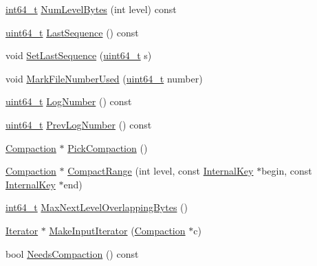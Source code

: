 \begin{DoxyCompactItemize}
\item 
\hyperlink{stdint_8h_adec1df1b8b51cb32b77e5b86fff46471}{int64\+\_\+t} \hyperlink{classleveldb_1_1_version_set_adfe3e1061becd9e2756b2dd4447b52e0}{Num\+Level\+Bytes} (int level) const 
\item 
\hyperlink{stdint_8h_aaa5d1cd013383c889537491c3cfd9aad}{uint64\+\_\+t} \hyperlink{classleveldb_1_1_version_set_acbbb32422426416b0d5e58d35b151526}{Last\+Sequence} () const 
\item 
void \hyperlink{classleveldb_1_1_version_set_a2234860e72a1ac7361d7bee107da6a07}{Set\+Last\+Sequence} (\hyperlink{stdint_8h_aaa5d1cd013383c889537491c3cfd9aad}{uint64\+\_\+t} s)
\item 
void \hyperlink{classleveldb_1_1_version_set_a8a009a58938b12c7a69bda2b4da115a0}{Mark\+File\+Number\+Used} (\hyperlink{stdint_8h_aaa5d1cd013383c889537491c3cfd9aad}{uint64\+\_\+t} number)
\item 
\hyperlink{stdint_8h_aaa5d1cd013383c889537491c3cfd9aad}{uint64\+\_\+t} \hyperlink{classleveldb_1_1_version_set_a0ff6a25abcf0b0c7d94bd425b6fb0ef2}{Log\+Number} () const 
\item 
\hyperlink{stdint_8h_aaa5d1cd013383c889537491c3cfd9aad}{uint64\+\_\+t} \hyperlink{classleveldb_1_1_version_set_a0c2a382650ba2b987d8059faacbd0c39}{Prev\+Log\+Number} () const 
\item 
\hyperlink{classleveldb_1_1_compaction}{Compaction} $\ast$ \hyperlink{classleveldb_1_1_version_set_a1cdc6a05e0a7df9f29b5bccd485a0219}{Pick\+Compaction} ()
\item 
\hyperlink{classleveldb_1_1_compaction}{Compaction} $\ast$ \hyperlink{classleveldb_1_1_version_set_a3a03f9a6c86e861be314cf8e01f33142}{Compact\+Range} (int level, const \hyperlink{classleveldb_1_1_internal_key}{Internal\+Key} $\ast$begin, const \hyperlink{classleveldb_1_1_internal_key}{Internal\+Key} $\ast$end)
\item 
\hyperlink{stdint_8h_adec1df1b8b51cb32b77e5b86fff46471}{int64\+\_\+t} \hyperlink{classleveldb_1_1_version_set_a32dc1a7e1eaeeeac89286be3483ad612}{Max\+Next\+Level\+Overlapping\+Bytes} ()
\item 
\hyperlink{classleveldb_1_1_iterator}{Iterator} $\ast$ \hyperlink{classleveldb_1_1_version_set_a181194e96a88e69a60c1fda9cf3c4651}{Make\+Input\+Iterator} (\hyperlink{classleveldb_1_1_compaction}{Compaction} $\ast$c)
\item 
bool \hyperlink{classleveldb_1_1_version_set_aa2976498024282e1449dcba88c6df162}{Needs\+Compaction} () const 
\item 

\end{DoxyCompactItemize}
